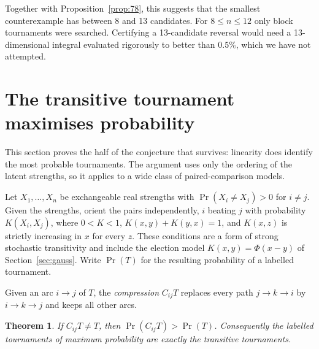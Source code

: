 \documentclass[11pt,a4paper]{article}
\newtheorem{theorem}{Theorem}[section]
\theoremstyle{definition}
\begin{document}
Together with Proposition~\ref{prop:78}, this suggests that the smallest counterexample has between 8 and 13 candidates. For $8\le n\le12$ only block tournaments were searched. Certifying a 13-candidate reversal would need a 13-dimensional integral evaluated rigorously to better than $0.5\%$, which we have not attempted.

\section{The transitive tournament maximises probability}\label{sec:compression}

This section proves the half of the conjecture that survives: linearity does identify the most probable tournaments. The argument uses only the ordering of the latent strengths, so it applies to a wide class of paired-comparison models.

Let $X_1,\ldots,X_n$ be exchangeable real strengths with $\Pr(X_i\ne X_j)>0$ for $i\ne j$. Given the strengths, orient the pairs independently, $i$ beating $j$ with probability $K(X_i,X_j)$, where $0<K<1$, $K(x,y)+K(y,x)=1$, and $K(x,z)$ is strictly increasing in $x$ for every $z$. These conditions are a form of strong stochastic transitivity \cite{sst} and include the election model $K(x,y)=\Phi(x-y)$ of Section~\ref{sec:gauss}. Write $\Pr(T)$ for the resulting probability of a labelled tournament.

Given an arc $i\to j$ of $T$, the \emph{compression} $C_{ij}T$ replaces every path $j\to k\to i$ by $i\to k\to j$ and keeps all other arcs.

\begin{theorem}\label{thm:compression}
If $C_{ij}T\ne T$, then $\Pr(C_{ij}T)>\Pr(T)$. Consequently the labelled tournaments of maximum probability are exactly the transitive tournaments.
\end{theorem}
\end{document}
